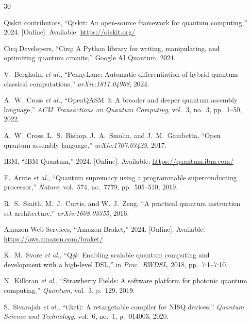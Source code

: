 \documentclass[journal]{IEEEtran}
\begin{document}


\begin{thebibliography}{30}

Qiskit contributors, ``Qiskit: An open-source framework for quantum computing,'' 2024. [Online]. Available: \url{https://qiskit.org/}

Cirq Developers, ``Cirq: A Python library for writing, manipulating, and optimizing quantum circuits,'' Google AI Quantum, 2024.

V.~Bergholm \emph{et al.}, ``PennyLane: Automatic differentiation of hybrid quantum-classical computations,'' \emph{arXiv:1811.04968}, 2024.

A.~W.~Cross \emph{et al.}, ``OpenQASM~3: A broader and deeper quantum assembly language,'' \emph{ACM Transactions on Quantum Computing}, vol.~3, no.~3, pp.~1--50, 2022.

A.~W.~Cross, L.~S.~Bishop, J.~A.~Smolin, and J.~M.~Gambetta, ``Open quantum assembly language,'' \emph{arXiv:1707.03429}, 2017.

IBM, ``IBM Quantum,'' 2024. [Online]. Available: \url{https://quantum.ibm.com/}

F.~Arute \emph{et al.}, ``Quantum supremacy using a programmable superconducting processor,'' \emph{Nature}, vol.~574, no.~7779, pp.~505--510, 2019.

R.~S.~Smith, M.~J.~Curtis, and W.~J.~Zeng, ``A practical quantum instruction set architecture,'' \emph{arXiv:1608.03355}, 2016.

Amazon Web Services, ``Amazon Braket,'' 2024. [Online]. Available: \url{https://aws.amazon.com/braket/}

K.~M.~Svore \emph{et al.}, ``Q\#: Enabling scalable quantum computing and development with a high-level DSL,'' in \emph{Proc.\ RWDSL}, 2018, pp.~7:1--7:10.

N.~Killoran \emph{et al.}, ``Strawberry Fields: A software platform for photonic quantum computing,'' \emph{Quantum}, vol.~3, p.~129, 2019.

S.~Sivarajah \emph{et al.}, ``t$|$ket$\rangle$: A retargetable compiler for NISQ devices,'' \emph{Quantum Science and Technology}, vol.~6, no.~1, p.~014003, 2020.


\end{thebibliography}
\end{document}
